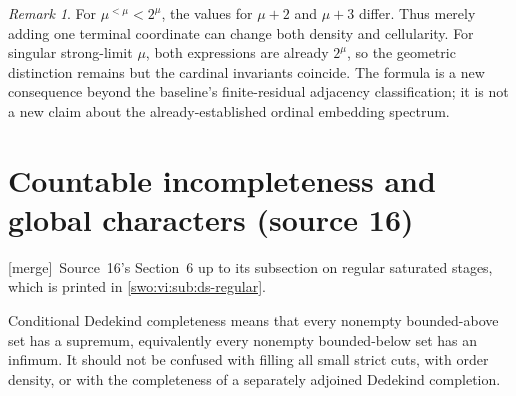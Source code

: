 \documentclass[11pt]{article}
\theoremstyle{definition}
\theoremstyle{remark}
\newtheorem{remark}[remark]{Remark}
\newcommand{\merge}{\textsf{[merge]}}
\begin{document}
\begin{remark}\label{swo:sh:n4.4}
For $\mu^{<\mu}<2^\mu$, the values for $\mu+2$ and $\mu+3$ differ.
Thus merely adding one terminal coordinate can change both density
and cellularity.  For singular strong-limit $\mu$, both expressions
are already $2^\mu$, so the geometric distinction remains but the
cardinal invariants coincide.  The formula is a new consequence beyond
the baseline's finite-residual adjacency classification; it is not a
new claim about the already-established ordinal embedding spectrum.
\end{remark}

\section{Countable incompleteness and global characters (source 16)}\label{swo:ds:sec:gaps}

\merge\ Source~16's Section~6 up to its subsection on regular saturated
stages, which is printed in \cref{swo:vi:sub:ds-regular}.


Conditional Dedekind completeness means that every nonempty bounded-above
set has a supremum, equivalently every nonempty bounded-below set has an
infimum. It should not be confused with filling all small strict cuts,
with order density, or with the completeness of a separately adjoined
Dedekind completion.
\end{document}
